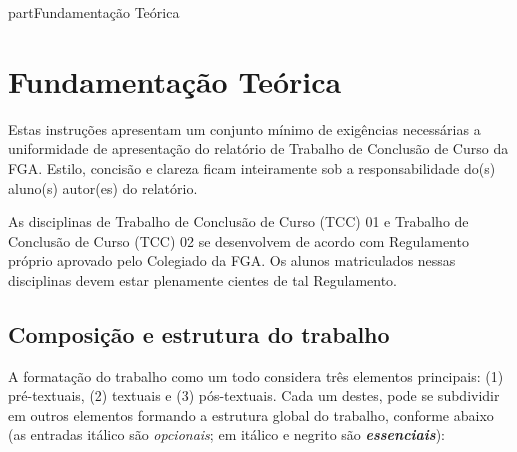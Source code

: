 part{Fundamentação Teórica}

\chapter[Fundamentação Teórica]{Fundamentação Teórica}

Estas instruções apresentam um conjunto mínimo de exigências necessárias a
uniformidade de apresentação do relatório de Trabalho de Conclusão de Curso
da FGA. Estilo, concisão e clareza ficam inteiramente sob a
responsabilidade do(s) aluno(s) autor(es) do relatório.

As disciplinas de Trabalho de Conclusão de Curso (TCC) 01 e Trabalho de
Conclusão de Curso (TCC) 02 se desenvolvem de acordo com Regulamento
próprio aprovado pelo Colegiado da FGA. Os alunos matriculados nessas
disciplinas devem estar plenamente cientes de tal Regulamento.

\section{Composição e estrutura do trabalho}

A formatação do trabalho como um todo considera três elementos principais:
(1) pré-textuais, (2) textuais e (3) pós-textuais. Cada um destes, pode se
subdividir em outros elementos formando a estrutura global do trabalho,
conforme abaixo (as entradas itálico são \textit{opcionais}; em itálico e
negrito são \textbf{\textit{essenciais}}):

